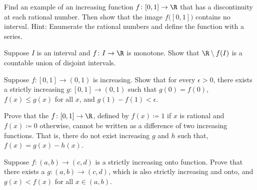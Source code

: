 \begin{exercise}[Challenging] \label{exercise:increasingfuncdiscatQ}
Find an example of an increasing function $f \colon [0,1] \to \R$
that has a discontinuity at each rational number.  Then show that the image
$f\bigl([0,1]\bigr)$ contains no interval.  Hint: Enumerate
the rational numbers and define
the function with a series.
\end{exercise}

\begin{exercise}
Suppose $I$ is an interval and $f \colon I \to \R$ is monotone.
Show that $\R \setminus f(I)$ is a countable union of disjoint intervals.
\end{exercise}

\begin{exercise}
Suppose $f \colon [0,1] \to (0,1)$ is increasing.  Show that for every
$\epsilon > 0$, there exists
a strictly increasing $g \colon [0,1] \to (0,1)$ such that
$g(0) = f(0)$, $f(x) \leq g(x)$ for all $x$, and $g(1)-f(1) < \epsilon$.
\end{exercise}

\begin{exercise}
Prove that the 
$f \colon [0,1] \to\R$, defined by $f(x) \coloneqq 1$
if $x$ is rational and $f(x) \coloneqq 0$ otherwise, cannot be written as a
difference of two increasing functions.  That is, there do not exist
increasing $g$ and $h$ such that, $f(x) = g(x) - h(x)$.
\end{exercise}

\begin{exercise}
Suppose $f \colon (a,b) \to (c,d)$ is a strictly increasing
onto function.  Prove that there exists a $g \colon (a,b) \to (c,d)$,
which is also strictly increasing and onto, and $g(x) < f(x)$ for all $x \in
(a,b)$.
\end{exercise}


